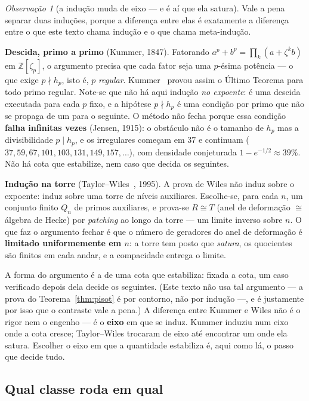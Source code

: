 \documentclass[11pt,a4paper]{article}
\theoremstyle{plain}
\theoremstyle{definition}
\theoremstyle{remark}
\newtheorem{obs}[teorema]{Observação}
\newcommand{\Z}{\mathbb{Z}}
\begin{document}
\begin{obs}[a indução muda de eixo --- e é aí que ela satura]\label{obs:eixo}
Vale a pena separar duas induções, porque a diferença entre elas é exatamente a diferença entre
o que este texto chama indução e o que chama meta-indução.

\textbf{Descida, primo a primo} (Kummer, 1847). Fatorando $a^p+b^p=\prod_k(a+\zeta^k b)$ em
$\Z[\zeta_p]$, o argumento precisa que cada fator seja uma $p$-ésima potência --- o que exige
$p \nmid h_p$, isto é, $p$ \emph{regular}. Kummer~\cite{kummer1847} provou assim o Último Teorema
para todo primo regular. Note-se que não há aqui indução \emph{no expoente}: é uma descida
executada para cada $p$ fixo, e a hipótese $p\nmid h_p$ é uma condição por primo que não se
propaga de um para o seguinte. O método não fecha porque essa condição \textbf{falha infinitas
vezes} (Jensen, 1915): o obstáculo não é o tamanho de $h_p$ mas a divisibilidade $p\mid h_p$, e os
irregulares começam em $37$ e continuam ($37, 59, 67, 101, 103, 131, 149, 157, \dots$), com
densidade conjeturada $1-e^{-1/2}\approx 39\%$. Não há cota que estabilize, nem caso que decida os
seguintes.

\textbf{Indução na torre} (Taylor--Wiles~\cite{taylorwiles1995}, 1995). A prova de Wiles não induz sobre o expoente:
induz sobre uma torre de níveis auxiliares. Escolhe-se, para cada $n$, um conjunto finito $Q_n$ de
primos auxiliares, e prova-se $R \cong T$ (anel de deformação $\cong$ álgebra de Hecke) por
\emph{patching} ao longo da torre --- um limite inverso sobre $n$. O que faz o argumento fechar é
que o número de geradores do anel de deformação é \textbf{limitado uniformemente em $n$}: a torre
tem posto que \emph{satura}, os quocientes são finitos em cada andar, e a compacidade entrega o
limite.

A forma do argumento é a de uma cota que estabiliza: fixada a cota, um caso verificado depois
dela decide os seguintes. (Este texto não usa tal argumento --- a prova do Teorema~\ref{thm:pisot}
é por contorno, não por indução ---, e é justamente por isso que o contraste vale a pena.) A
diferença entre
Kummer e Wiles não é o rigor nem o engenho --- é o \textbf{eixo} em que se induz. Kummer induziu
num eixo onde a cota cresce; Taylor--Wiles trocaram de eixo até encontrar um onde ela satura.
Escolher o eixo em que a quantidade estabiliza é, aqui como lá, o passo que decide tudo.
\end{obs}

\subsection{Qual classe roda em qual}\label{sec:classes}
\end{document}
